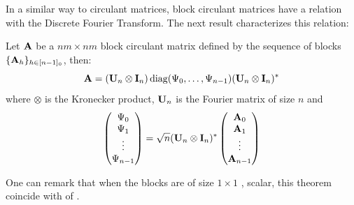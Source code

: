 In a similar way to circulant matrices, block circulant matrices have a relation with the Discrete Fourier Transform.
The next result characterizes this relation:
\begin{theorem}
  Let $\mathbf{A}$ be a $nm\times nm$ block circulant matrix defined by the sequence of blocks $\{\mathbf{A}_h\}_{h \in [n-1]_0}$, then:
  \begin{equation}
    \mathbf{A} = (\mathbf{U}_n \otimes \mathbf{I}_n) \operatorname*{diag}(\Psi_0, \dots, \Psi_{n-1}) (\mathbf{U}_n \otimes \mathbf{I}_n)^*
  \end{equation}
  where $\otimes$ is the Kronecker product, $\mathbf{U}_n$ is the Fourier matrix of size $n$ and
  \begin{equation}
    \begin{pmatrix}
      \Psi_{0} \\
      \Psi_{1} \\
      \vdots \\
      \Psi_{n-1} \\
    \end{pmatrix} = 
    \sqrt{n}(\mathbf{U}_n \otimes \mathbf{I}_n)^* 
    \begin{pmatrix}
      \mathbf{A}_{0} \\
      \mathbf{A}_{1} \\
      \vdots \\
      \mathbf{A}_{n-1} \\
    \end{pmatrix}
  \end{equation}
\end{theorem}
\noindent
One can remark that when the blocks are of size $1\times1$ \ie, scalar, this theorem coincide with  of .



